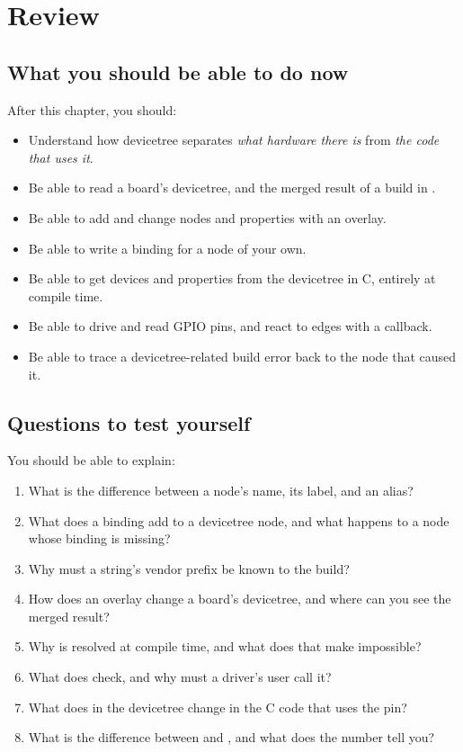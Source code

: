 
\section{Review}
\label{c2:sec:review}

\subsection*{What you should be able to do now}
After this chapter, you should:

\begin{itemize}
  \item Understand how devicetree separates \emph{what hardware there is} from \emph{the code that uses it}.
  \item Be able to read a board’s devicetree, and the merged result of a build in .
  \item Be able to add and change nodes and properties with an overlay.
  \item Be able to write a binding for a node of your own.
  \item Be able to get devices and properties from the devicetree in C, entirely at compile time.
  \item Be able to drive and read GPIO pins, and react to edges with a callback.
  \item Be able to trace a devicetree-related build error back to the node that caused it.
\end{itemize}

\subsection*{Questions to test yourself}
You should be able to explain:

\begin{enumerate}
  \item What is the difference between a node’s name, its label, and an alias?
  \item What does a binding add to a devicetree node, and what happens to a node whose binding is missing?
  \item Why must a  string’s vendor prefix be known to the build?
  \item How does an overlay change a board’s devicetree, and where can you see the merged result?
  \item Why is  resolved at compile time, and what does that make impossible?
  \item What does  check, and why must a driver’s user call it?
  \item What does  in the devicetree change in the C code that uses the pin?
  \item What is the difference between  and , and what does the number tell you?
\end{enumerate}

